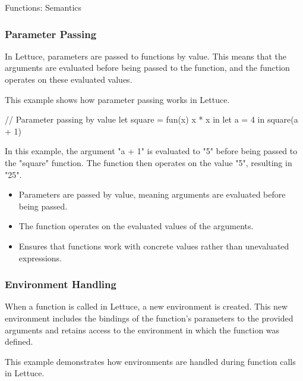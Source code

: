 \begin{notes}{Functions: Semantics}
    \subsubsection*{Parameter Passing}
    
    In Lettuce, parameters are passed to functions by value. This means that the arguments are evaluated before being passed to the function, and the function operates on these evaluated values.
    
    \begin{highlight}
    
        This example shows how parameter passing works in Lettuce.
    
    \begin{code}[Lettuce]
    // Parameter passing by value
    let square = fun(x) {
        x * x
    } in
    let a = 4 in
    square(a + 1)
    \end{code}
    
        In this example, the argument "a + 1" is evaluated to "5" before being passed to the "square" function. The function then operates on the value "5", resulting in "25".
    
        \begin{itemize}
            \item Parameters are passed by value, meaning arguments are evaluated before being passed.
            \item The function operates on the evaluated values of the arguments.
            \item Ensures that functions work with concrete values rather than unevaluated expressions.
        \end{itemize}
    
    \end{highlight}
    
    \subsubsection*{Environment Handling}
    
    When a function is called in Lettuce, a new environment is created. This new environment includes the bindings of the function's parameters to the provided arguments and retains access to the environment in which the function was defined.
    
    \begin{highlight}
    
        This example demonstrates how environments are handled during function calls in Lettuce.
    

\end{highlight}
\end{notes}
